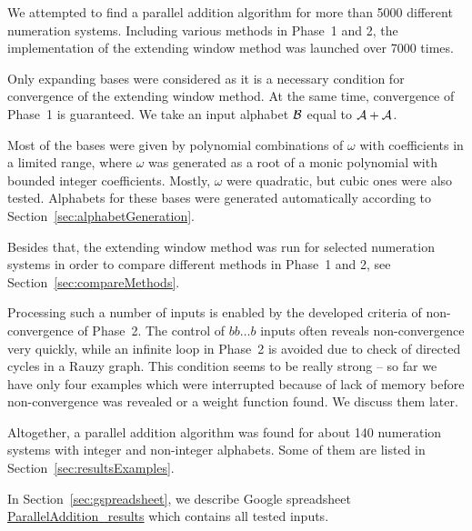 We attempted to find a parallel addition algorithm for more than 5000 different numeration systems. Including various methods in Phase~1 and 2, the implementation of the extending window method was launched over 7000 times. 

Only expanding bases were considered as it is a necessary condition for convergence of the extending window method. At the same time, convergence of Phase~1 is guaranteed. We take an input alphabet $\mathcal{B}$ equal to $\mathcal{A}+\mathcal{A}$.

Most of the bases were given by polynomial combinations of $\omega$ with coefficients in a limited range, where $\omega$ was generated as a root of a monic polynomial with bounded integer coefficients. Mostly, $\omega$ were  quadratic, but cubic ones were also tested. Alphabets for these bases were generated automatically according to Section~\ref{sec:alphabetGeneration}.

Besides that, the extending window method was run for selected numeration systems in order to compare different methods in Phase~1 and 2, see  Section~\ref{sec:compareMethods}.

Processing such a number of inputs is enabled by the developed criteria of non-convergence of Phase~2. The control of $bb\dots b$ inputs often reveals non-convergence very quickly, while an infinite loop in Phase~2 is avoided due to check of directed cycles in a Rauzy graph. This condition seems to be really strong -- so far we have only four examples which were interrupted because of lack of memory before non-convergence was revealed or a weight function found. We discuss them later.

Altogether, a parallel addition algorithm was found for about 140
numeration systems with integer and non-integer alphabets. Some of them are listed in Section~\ref{sec:resultsExamples}.

In Section~\ref{sec:gspreadsheet}, we describe Google spreadsheet \href{https://docs.google.com/spreadsheets/d/1TnhrHdefHfHa0WSeVs4q6XVj3epjPlPlnoekE0E1xeM/edit?usp=sharing}{ParallelAddition\_results} which contains all tested inputs.

